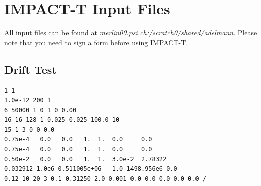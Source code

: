 \documentclass{psi-note}    %
\begin{document}
{%






\section{IMPACT-T Input Files}
All input files can be found at {\em merlin00.psi.ch:/scratch0/shared/adelmann}.
Please note that you need to sign a form before using IMPACT-T.

\subsection{Drift Test}
\begin{verbatim}
1 1
1.0e-12 200 1
6 50000 1 0 1 0 0.00
16 16 128 1 0.025 0.025 100.0 10
15 1 3 0 0 0.0
0.75e-4   0.0   0.0   1.  1.  0.0     0.0
0.75e-4   0.0   0.0   1.  1.  0.0     0.0
0.50e-2   0.0   0.0   1.  1.  3.0e-2  2.78322
0.032912 1.0e6 0.511005e+06  -1.0 1498.956e6 0.0
0.12 10 20 3 0.1 0.31250 2.0 0.001 0.0 0.0 0.0 0.0 0.0 /
\end{verbatim}
}
\end{document}
